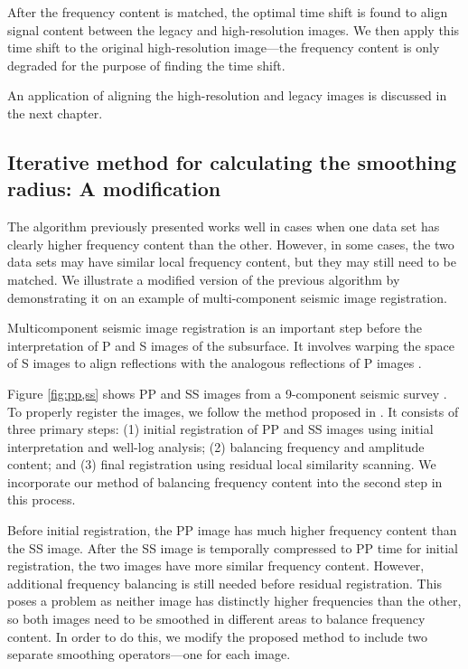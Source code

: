         After the frequency content is matched, the optimal time shift is found to align signal content between the legacy and high-resolution images. We then apply this time shift to the original high-resolution image---the frequency content is only degraded for the purpose of finding the time shift. 
        
        An application of aligning the high-resolution and legacy images is discussed in the next chapter.


\subsection{Iterative method for calculating the smoothing radius: A modification}
        The algorithm previously presented works well in cases when one data set has clearly higher frequency content than the other.
        However, in some cases, the two data sets may have similar local frequency content, but they may still need to be matched.
        We illustrate a modified version of the previous algorithm by demonstrating it on an example of multi-component seismic image registration.

        Multicomponent seismic image registration is an important step before the interpretation of P and S images of the subsurface. It involves warping the space of S images to align reflections with the analogous reflections of P images \cite[]{fomel2003,warp}.

        Figure \ref{fig:pp,ss} shows PP and SS images from a 9-component seismic survey \cite[]{attr}.
        To properly register the images, we follow the method proposed in \cite{warp}. 
        It consists of three primary steps: (1) initial registration of PP and SS images using initial interpretation and well-log analysis; (2) balancing frequency and amplitude content; and (3) final registration using residual local similarity scanning. 
        We incorporate our method of balancing frequency content into the second step in this process.

        Before initial registration, the PP image has much higher frequency content than the SS image. 
        After the SS image is temporally compressed to PP time for initial registration, the two images have more similar frequency content. 
        However, additional frequency balancing is still needed before residual registration. 
        This poses a problem as neither image has distinctly higher frequencies than the other, so both images need to be smoothed in different areas to balance frequency content. 
        In order to do this, we modify the proposed method to include two separate smoothing operators---one for each image.

